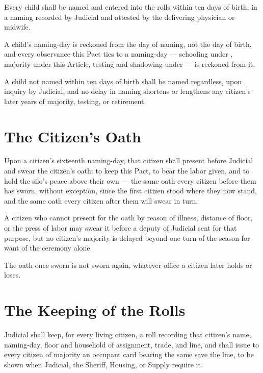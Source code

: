\begin{clauses}
\item Every child shall be named and entered into the rolls within ten days of birth, in a naming recorded by Judicial and attested by the delivering physician or midwife.
\item A child's naming-day is reckoned from the day of naming, not the day of birth, and every observance this Pact ties to a naming-day --- schooling under , majority under this Article, testing and shadowing under  --- is reckoned from it.
\item A child not named within ten days of birth shall be named regardless, upon inquiry by Judicial, and no delay in naming shortens or lengthens any citizen's later years of majority, testing, or retirement.
\end{clauses}

\section{The Citizen's Oath}
\label{sec:citizenship:citizens-oath}

Upon a citizen's sixteenth naming-day, that citizen shall present before Judicial and swear the citizen's oath: to keep this Pact, to bear the labor given, and to hold the silo's peace above their own --- the same oath every citizen before them has sworn, without exception, since the first citizen stood where they now stand, and the same oath every citizen after them will swear in turn.

\begin{clauses}
\item A citizen who cannot present for the oath by reason of illness, distance of floor, or the press of labor may swear it before a deputy of Judicial sent for that purpose, but no citizen's majority is delayed beyond one turn of the season for want of the ceremony alone.
\item The oath once sworn is not sworn again, whatever office a citizen later holds or loses.
\end{clauses}

\section{The Keeping of the Rolls}
\label{sec:citizenship:keeping-of-the-rolls}

Judicial shall keep, for every living citizen, a roll recording that citizen's name, naming-day, floor and household of assignment, trade, and line, and shall issue to every citizen of majority an occupant card bearing the same save the line, to be shown when Judicial, the Sheriff, Housing, or Supply require it.

